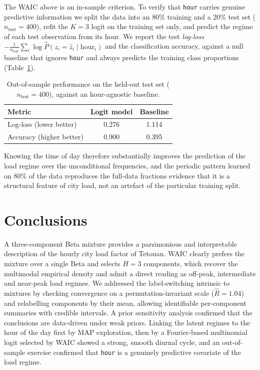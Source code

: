 \documentclass{article}
\newcommand{\bestH}{3}
\newcommand{\rhatlik}{1.04}
\newcommand{\bestK}{3}
\newcommand{\ntest}{400}
\newcommand{\logloss}{0.276}
\newcommand{\loglossbase}{1.114}
\newcommand{\acc}{0.900}
\newcommand{\accbase}{0.395}
\begin{document}
The WAIC above is an in-sample criterion. To verify that \texttt{hour}
carries genuine predictive information we split the data into an $80\%$
training and a $20\%$ test set ($n_\text{test}=\ntest$), refit the
$K=\bestK$ logit on the training set only, and predict the regime of each
test observation from its hour. We report the test \emph{log-loss}
$-\frac1{n_\text{test}}\sum_{i}\log\hat P(z_i=\hat z_i\mid\mathrm{hour}_i)$
and the classification accuracy, against a null baseline that ignores
\texttt{hour} and always predicts the training class proportions
(Table~\ref{tab:pred}).

\begin{table}[H]
\centering
\caption{Out-of-sample performance on the held-out test set
($n_\text{test}=\ntest$), against an hour-agnostic baseline.}
\label{tab:pred}
\begin{tabular}{lcc}
\toprule
Metric & Logit model & Baseline\\
\midrule
Log-loss (lower better) & \logloss & \loglossbase\\
Accuracy (higher better) & \acc & \accbase\\
\bottomrule
\end{tabular}
\end{table}

Knowing the time of day therefore
substantially improves the prediction of the load regime over the
unconditional frequencies, and the periodic pattern learned on $80\%$ of the
data reproduces the full-data fractions evidence that it is a structural
feature of city load, not an artefact of the particular training split.

\section{Conclusions}

A three-component Beta mixture provides a parsimonious and interpretable
description of the hourly city load factor of Tetouan. WAIC clearly prefers
the mixture over a single Beta and selects $H=\bestH$ components, which
recover the multimodal empirical density and admit a direct reading as
off-peak, intermediate and near-peak load regimes. We addressed the
label-switching intrinsic to mixtures by checking convergence on a
permutation-invariant scale ($\widehat R=\rhatlik$) and relabelling
components by their mean, allowing identifiable per-component summaries with
credible intervals. A prior sensitivity analysis confirmed that the
conclusions are data-driven under weak priors. Linking the latent regimes to
the hour of the day first by MAP exploration, then by a Fourier-based
multinomial logit selected by WAIC showed a strong, smooth diurnal
cycle, and an out-of-sample exercise confirmed that \texttt{hour} is a
genuinely predictive covariate of the load regime.
\end{document}
